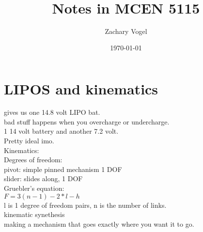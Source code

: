 \documentclass{article}
\author{Zachary Vogel}
\date{\today}
\title{Notes in MCEN 5115}
\begin{document}
\maketitle


\section*{LIPOS and kinematics}
gives us one 14.8 volt LIPO bat.\\
bad stuff happens when you overcharge or undercharge.\\
1 14 volt battery and another 7.2 volt.\\
Pretty ideal imo.\\


Kinematics:\\
Degrees of freedom:\\
pivot: simple pinned mechanism 1 DOF\\
slider: slides along, 1 DOF\\

Gruebler's equation:\\
$F=3(n-1)-2*l-h$\\
l is 1 degree of freedom pairs, n is the number of links.\\

kinematic synethesis\\
making a mechanism that goes exactly where you want it to go.\\
\end{document}
